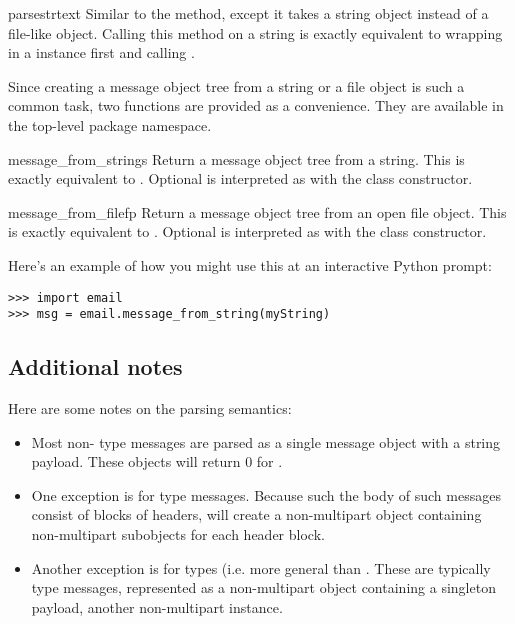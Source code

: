 \begin{methoddesc}[Parser]{parsestr}{text}
Similar to the  method, except it takes a string
object instead of a file-like object.  Calling this method on a string
is exactly equivalent to wrapping  in a 
instance first and calling .
\end{methoddesc}

Since creating a message object tree from a string or a file object is
such a common task, two functions are provided as a convenience.  They
are available in the top-level  package namespace.

\begin{funcdesc}{message_from_string}{s}
Return a message object tree from a string.  This is exactly
equivalent to .  Optional  is
interpreted as with the  class constructor.
\end{funcdesc}

\begin{funcdesc}{message_from_file}{fp}
Return a message object tree from an open file object.  This is exactly
equivalent to .  Optional  is
interpreted as with the  class constructor.
\end{funcdesc}

Here's an example of how you might use this at an interactive Python
prompt:

\begin{verbatim}
>>> import email
>>> msg = email.message_from_string(myString)
\end{verbatim}

\subsection{Additional notes}

Here are some notes on the parsing semantics:

\begin{itemize}
\item Most non- type messages are parsed as a single
      message object with a string payload.  These objects will return
      0 for .
\item One exception is for  type
      messages.  Because such the body of such messages consist of
      blocks of headers,  will create a non-multipart
      object containing non-multipart subobjects for each header
      block.
\item Another exception is for  types (i.e. more
      general than .  These are
      typically  type messages, represented as a
      non-multipart object containing a singleton payload, another
      non-multipart  instance.
\end{itemize}
